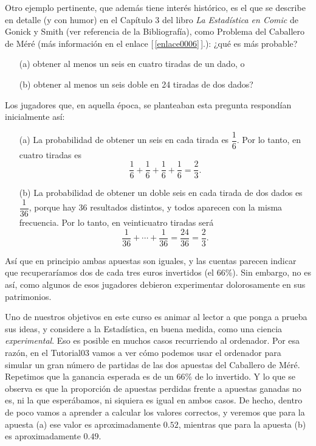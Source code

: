 Otro ejemplo pertinente, que además tiene interés histórico, es el que se describe en detalle (y
con humor) en el Capítulo 3 del libro {\em La Estadística en Comic} de Gonick y Smith (ver
referencia \cite{EstadisticaComic} de la Bibliografía), como {\sf Problema del Caballero de
Méré} (más información en el enlace [\,\ref{enlace0006}\,].\label{enlace0006a}): ¿qué
es más probable?
    \begin{itemize}
    \item[(a)] obtener al menos un seis en cuatro tiradas de un dado, o
    \item[(b)] obtener al menos un seis doble en 24 tiradas de dos dados?
    \end{itemize}
    Los jugadores que, en aquella época, se planteaban esta pregunta respondían inicialmente así:
    \begin{itemize}
    \item[(a)] La probabilidad de obtener un seis en cada tirada es $\dfrac{1}{6}$. Por lo tanto, en cuatro tiradas es
    \[\dfrac{1}{6}+\dfrac{1}{6}+\dfrac{1}{6}+\dfrac{1}{6} = \dfrac{2}{3}.\]

    \item[(b)] La probabilidad de obtener un doble seis en cada tirada de dos dados es $\dfrac{1}{36}$, porque hay 36 resultados distintos, y todos aparecen con la misma frecuencia. Por lo tanto, en veinticuatro tiradas será \[\dfrac{1}{36}+\cdots+\dfrac{1}{36}=\dfrac{24}{36}=\dfrac{2}{3}.\]
    \end{itemize}
Así que en principio ambas apuestas son iguales, y las cuentas parecen indicar que recuperaríamos dos de cada tres euros invertidos (el 66\%). Sin embargo, no es así, como algunos de esos jugadores debieron experimentar dolorosamente en sus patrimonios.

Uno de nuestros objetivos en este curso es animar al lector a que ponga a prueba sus ideas, y considere a la Estadística, en buena medida, como una ciencia {\em experimental}. Eso es posible en muchos casos recurriendo al ordenador. Por esa razón, en el Tutorial03 vamos a ver cómo podemos usar el ordenador para simular un gran número de partidas de las dos apuestas del Caballero de Méré. Repetimos que la ganancia esperada es de un 66\% de lo invertido. Y lo que se observa es que la proporción de apuestas perdidas frente a apuestas ganadas no es, ni la que esperábamos, ni siquiera es igual en ambos casos. De hecho, dentro de poco vamos a aprender a calcular los valores correctos, y veremos que para la apuesta (a) ese valor es aproximadamente $0.52$, mientras que para la apuesta (b) es aproximadamente $0.49$.
%
%


